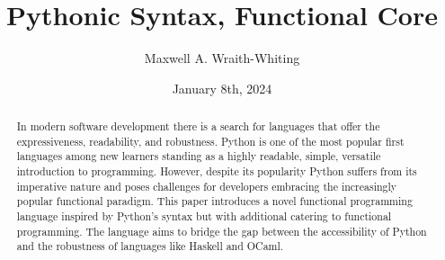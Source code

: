 \documentclass{l4proj}
\begin{document}
\title{Pythonic Syntax, Functional Core}
\author{Maxwell A. Wraith-Whiting}
\date{January 8th, 2024}

\maketitle

\begin{abstract}





    In modern software development there is a search for languages that offer the expressiveness, readability, and robustness.
    Python is one of the most popular first languages among new learners standing as a highly readable, simple, versatile introduction to programming.
    However, despite its popularity Python suffers from its imperative nature and poses challenges for developers embracing the increasingly popular functional paradigm.
    This paper introduces a novel functional programming language inspired by Python’s syntax but with additional catering to functional programming.
    The language aims to bridge the gap between the accessibility of Python and the robustness of languages like Haskell and OCaml.

\end{abstract}
\end{document}
